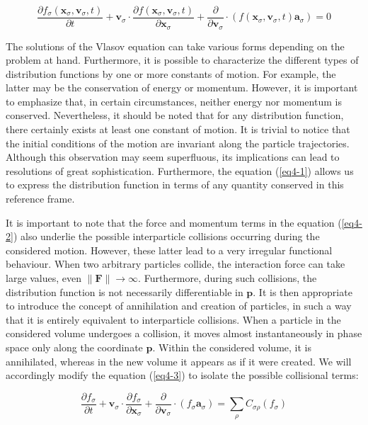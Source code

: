 \begin{equation}
    \label{eq4-3}
    \frac{\partial f_\sigma(\mathbf{x}_\sigma,\mathbf{v}_\sigma,t)}{\partial t}+\mathbf{v}_\sigma\cdot\frac{\partial f(\mathbf{x}_\sigma,\mathbf{v}_\sigma,t)}{\partial\mathbf{x}_\sigma}+\frac{\partial}{\partial\mathbf{v}_\sigma}\cdot\left(f(\mathbf{x}_\sigma,\mathbf{v}_\sigma,t)\mathbf{a}_\sigma\right)=0
\end{equation}

The solutions of the Vlasov equation can take various forms depending on the problem at hand. Furthermore, it is possible to characterize the different types of distribution functions by one or more constants of motion. For example, the latter may be the conservation of energy or momentum. However, it is important to emphasize that, in certain circumstances, neither energy nor momentum is conserved. Nevertheless, it should be noted that for any distribution function, there certainly exists at least one constant of motion. It is trivial to notice that the initial conditions of the motion are invariant along the particle trajectories. Although this observation may seem superfluous, its implications can lead to resolutions of great sophistication. Furthermore, the equation (\ref{eq4-1}) allows us to express the distribution function in terms of any quantity conserved in this reference frame.

\quad It is important to note that the force and momentum terms in the equation (\ref{eq4-2}) also underlie the possible interparticle collisions occurring during the considered motion. However, these latter lead to a very irregular functional behaviour. When two arbitrary particles collide, the interaction force can take large values, even $\|\mathbf{F}\|\to\infty$. Furthermore, during such collisions, the distribution function is not necessarily differentiable in $\mathbf{p}$. It is then appropriate to introduce the concept of annihilation and creation of particles, in such a way that it is entirely equivalent to interparticle collisions. When a particle in the considered volume undergoes a collision, it moves almost instantaneously in phase space only along the coordinate $\mathbf{p}$. Within the considered volume, it is annihilated, whereas in the new volume it appears as if it were created. We will accordingly modify the equation (\ref{eq4-3}) to isolate the possible collisional terms:

\begin{equation}
    \label{eq4-4}
    \frac{\partial f_\sigma}{\partial t}+\mathbf{v}_\sigma\cdot\frac{\partial f_\sigma}{\partial\mathbf{x}_\sigma}+\frac{\partial}{\partial\mathbf{v}_\sigma}\cdot\left(f_\sigma\mathbf{a}_\sigma\right)=\sum_{\rho}C_{\sigma\rho}(f_\sigma)
\end{equation}

